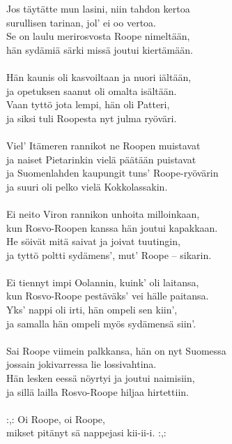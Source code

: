 
        Jos täytätte mun lasini, niin tahdon kertoa \\
        surullisen tarinan, jol' ei oo vertoa. \\
        Se on laulu merirosvosta Roope nimeltään, \\
        hän sydämiä särki missä joutui kiertämään. \\
\hspace{10mm} \\
        Hän kaunis oli kasvoiltaan ja nuori iältään, \\
        ja opetuksen saanut oli omalta isältään. \\
        Vaan tyttö jota lempi, hän oli Patteri, \\
        ja siksi tuli Roopesta nyt julma ryöväri. \\
\hspace{10mm} \\
        Viel' Itämeren rannikot ne Roopen muistavat \\
        ja naiset Pietarinkin vielä päätään puistavat \\
        ja Suomenlahden kaupungit tuns' Roope-ryövärin \\
        ja suuri oli pelko vielä Kokkolassakin. \\
\hspace{10mm} \\
        Ei neito Viron rannikon unhoita milloinkaan, \\
        kun Rosvo-Roopen kanssa hän joutui kapakkaan. \\
        He söivät mitä saivat ja joivat tuutingin, \\
        ja tyttö poltti sydämens', mut' Roope – sikarin. \\
\hspace{10mm} \\
        Ei tiennyt impi Oolannin, kuink' oli laitansa, \\
        kun Rosvo-Roope pestäväks' vei hälle paitansa. \\
        Yks' nappi oli irti, hän ompeli sen kiin', \\
        ja samalla hän ompeli myös sydämensä siin'. \\
\hspace{10mm} \\
        Sai Roope viimein palkkansa, hän on nyt Suomessa \\
        jossain jokivarressa lie lossivahtina. \\
        Hän lesken eessä nöyrtyi ja joutui naimisiin, \\
        ja sillä lailla Rosvo-Roope hiljaa hirtettiin. \\
\hspace{10mm} \\
        :,: Oi Roope, oi Roope, \\
        mikset pitänyt sä nappejasi kii-ii-i. :,: \\
